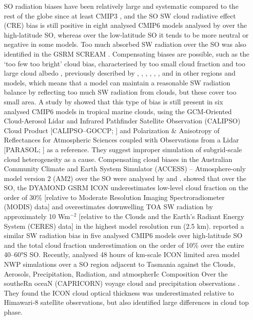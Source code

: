 \documentclass[12pt,a4paper]{article}
\begin{document}
SO radiation biases have been relatively large and systematic compared to the
rest of the globe since at least CMIP3 \citep{trenberth2010}, and the SO SW
cloud radiative effect (CRE) bias is still positive in eight analysed CMIP6
models analysed by \cite{schuddeboom2021} over the high-latitude SO, whereas
over the low-latitude SO it tends to be more neutral or negative in some
models. Too much absorbed SW radiation over the SO was also identified in the
GSRM SCREAM \cite{caldwell2021}. Compensating biases are possible, such as the
`too few too bright' cloud bias, characterised by too small cloud fraction and
too large cloud albedo \citep{wall2017,kuma2020}, previously described by
\cite{webb2001}, \cite{weare2004}, \cite{zhang2005}, \cite{karlsson2008},
\cite{nam2012}, \cite{klein2013}, and \cite{bender2017} in other regions and
models, which means that a model can maintain a reasonable SW radiation balance
by reflecting too much SW radiation from clouds, but these cover too small
area.  A study by \cite{konsta2022} showed that this type of bias is still
present in six analysed CMIP6 models in tropical marine clouds, using the
GCM-Oriented Cloud-Aerosol Lidar and Infrared Pathfinder Satellite Observation
(CALIPSO) Cloud Product [CALIPSO--GOCCP; \cite{chepfer2010}] and Polarization
\& Anisotropy of Reflectances for Atmospheric Sciences coupled with
Observations from a Lidar [PARASOL; \cite{lier2008}] as a reference. They
suggest improper simulation of subgrid-scale cloud heterogeneity as a cause.
Compensating cloud biases in the Australian Community Climate and Earth System
Simulator (ACCESS) – Atmosphere-only model version 2 (AM2) over the SO were
analysed by \cite{fiddes2022} and \cite{fiddes2024}.  \cite{possner2022} showed
that over the SO, the DYAMOND GSRM ICON underestimates low-level cloud fraction
on the order of 30\% [relative to Moderate Resolution Imaging Spectroradiometer
(MODIS) data] and overestimates downwelling TOA SW radiation by approximately
10 Wm$^\mathrm{-2}$ [relative to the Clouds and the Earth’s Radiant Energy
System (CERES) data] in the highest model resolution run (2.5 km).
\cite{zhao2022} reported a similar SW radiation bias in five analysed CMIP6
models over high-latitude SO and the total cloud fraction underestimation on
the order of 10\% over the entire 40--60°S SO. Recently, \cite{ramadoss2024}
analysed 48 hours of km-scale ICON limited area model NWP simulations over a SO
region adjacent to Tasmania against the Clouds, Aerosols, Precipitation,
Radiation, and atmospherIc Composition Over the southeRn oceaN (CAPRICORN)
voyage cloud and precipitation observations \cite{mcfarquhar2021}. They found
the ICON cloud optical thickness was underestimated relative to Himawari‐8
satellite observations, but also identified large differences in cloud top
phase.
\end{document}

